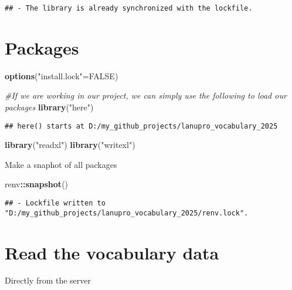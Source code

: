 \documentclass[
]{article}
\newenvironment{Shaded}{\begin{snugshade}}{\end{snugshade}}
\newcommand{\CommentTok}[1]{\textcolor[rgb]{0.56,0.35,0.01}{\textit{#1}}}
\newcommand{\ConstantTok}[1]{\textcolor[rgb]{0.56,0.35,0.01}{#1}}
\newcommand{\FunctionTok}[1]{\textcolor[rgb]{0.13,0.29,0.53}{\textbf{#1}}}
\newcommand{\NormalTok}[1]{#1}
\newcommand{\OtherTok}[1]{\textcolor[rgb]{0.56,0.35,0.01}{#1}}
\newcommand{\SpecialCharTok}[1]{\textcolor[rgb]{0.81,0.36,0.00}{\textbf{#1}}}
\newcommand{\StringTok}[1]{\textcolor[rgb]{0.31,0.60,0.02}{#1}}
\begin{document}
\begin{verbatim}
## - The library is already synchronized with the lockfile.
\end{verbatim}

\section{Packages}\label{packages}

\begin{Shaded}
\begin{Highlighting}[]
\FunctionTok{options}\NormalTok{(}\StringTok{"install.lock"}\OtherTok{=}\ConstantTok{FALSE}\NormalTok{)}

\CommentTok{\#If we are working in our project, we can simply use the following to load our packages}
\FunctionTok{library}\NormalTok{(}\StringTok{"here"}\NormalTok{)}
\end{Highlighting}
\end{Shaded}

\begin{verbatim}
## here() starts at D:/my_github_projects/lanupro_vocabulary_2025
\end{verbatim}

\begin{Shaded}
\begin{Highlighting}[]
\FunctionTok{library}\NormalTok{(}\StringTok{"readxl"}\NormalTok{)}
\FunctionTok{library}\NormalTok{(}\StringTok{"writexl"}\NormalTok{)}
\end{Highlighting}
\end{Shaded}

Make a snaphot of all packages

\begin{Shaded}
\begin{Highlighting}[]
\NormalTok{renv}\SpecialCharTok{::}\FunctionTok{snapshot}\NormalTok{()}
\end{Highlighting}
\end{Shaded}

\begin{verbatim}
## - Lockfile written to "D:/my_github_projects/lanupro_vocabulary_2025/renv.lock".
\end{verbatim}

\section{Read the vocabulary data}\label{read-the-vocabulary-data}

Directly from the server
\end{document}
